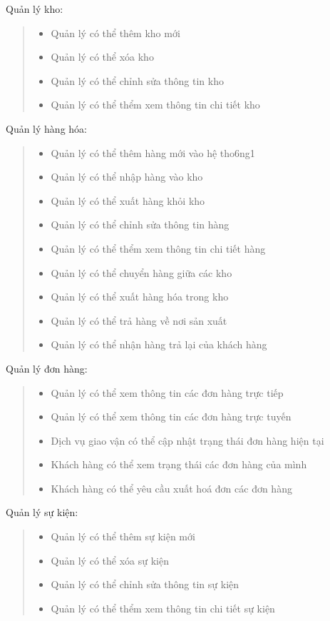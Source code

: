 Quản lý kho:
\begin{quote}
    \begin{itemize}
        \item Quản lý có thể thêm kho mới
        \item Quản lý có thể xóa kho
        \item Quản lý có thể chỉnh sửa thông tin kho
        \item Quản lý có thể thểm xem thông tin chi tiết kho
    \end{itemize}
\end{quote}

Quản lý hàng hóa:
\begin{quote}
    \begin{itemize}
        \item Quản lý có thể thêm hàng mới vào hệ tho6ng1
        \item Quản lý có thể nhập hàng vào kho
        \item Quản lý có thể xuất hàng khỏi kho
        \item Quản lý có thể chỉnh sửa thông tin hàng
        \item Quản lý có thể thểm xem thông tin chi tiết hàng
        \item Quản lý có thể chuyển hàng giữa các kho
        \item Quản lý có thể xuất hàng hóa trong kho
        \item Quản lý có thể trả hàng về nơi sản xuất
        \item Quản lý có thể nhận hàng trả lại của khách hàng
    \end{itemize}
\end{quote}

Quản lý đơn hàng:
\begin{quote}
    \begin{itemize}
        \item Quản lý có thể xem thông tin các đơn hàng trực tiếp
        \item Quản lý có thể xem thông tin các đơn hàng trực tuyến
        \item Dịch vụ giao vận có thể cập nhật trạng thái đơn hàng hiện tại
        \item Khách hàng có thể xem trạng thái các đơn hàng của mình
        \item Khách hàng có thể yêu cầu xuất hoá đơn các đơn hàng
    \end{itemize}
\end{quote}

Quản lý sự kiện:
\begin{quote}
    \begin{itemize}
        \item Quản lý có thể thêm sự kiện mới
        \item Quản lý có thể xóa sự kiện
        \item Quản lý có thể chỉnh sửa thông tin sự kiện
        \item Quản lý có thể thểm xem thông tin chi tiết sự kiện
    \end{itemize}
\end{quote}

